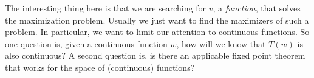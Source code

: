 \documentclass[12pt]{article}
\theoremstyle{definition}
\begin{document}
The interesting thing here is that we are searching for $v$, a \emph{function}, that solves the maximization problem. Usually we just want to find the maximizers of such a problem. In particular, we want to limit our attention to continuous functions. So one question is, given a continuous function $w$, how will we know that $T(w)$ is also continuous?  A second question is, is there an applicable fixed point theorem that works for the space of (continuous) functions? 
\end{document}

